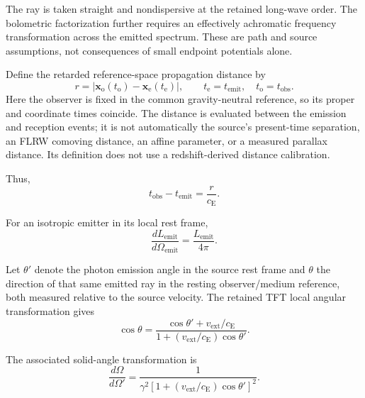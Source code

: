 The ray is taken straight and nondispersive at the retained long-wave order.
The bolometric factorization further requires an effectively achromatic
frequency transformation across the emitted spectrum. These are path and
source assumptions, not consequences of small endpoint potentials alone.

Define the retarded reference-space propagation distance by
\[
    r=\left|
        \mathbf x_{\mathrm o}(t_{\mathrm o})
        -\mathbf x_{\mathrm e}(t_{\mathrm e})
      \right|,
    \qquad
    t_{\mathrm e}=t_{\mathrm{emit}},\quad
    t_{\mathrm o}=t_{\mathrm{obs}}.
\]
Here the observer is fixed in the common gravity-neutral reference, so its
proper and coordinate times coincide. The distance is evaluated between the
emission and reception events; it is not automatically the source's
present-time separation, an FLRW comoving distance, an affine parameter, or
a measured parallax distance. Its definition does not use a redshift-derived
distance calibration.

Thus,
\begin{equation}
    t_{\mathrm{obs}}
    -
    t_{\mathrm{emit}}
    =
    \frac{r}{c_{\mathrm E}}.
\end{equation}

For an isotropic emitter in its local rest frame,
\begin{equation}
    \frac{
        dL_{\mathrm{emit}}
    }{
        d\Omega_{\mathrm{emit}}
    }
    =
    \frac{
        L_{\mathrm{emit}}
    }{
        4\pi
    }.
\end{equation}

Let \(\theta'\) denote the photon emission angle in the source rest frame
and \(\theta\) the direction of that same emitted ray in the resting
observer/medium reference, both measured relative to the source velocity.
The retained TFT local angular transformation gives
\begin{equation}
    \cos\theta
    =
    \frac{
        \cos\theta'
        +
        v_{\mathrm{ext}}/c_{\mathrm E}
    }{
        1+
        (v_{\mathrm{ext}}/c_{\mathrm E})
        \cos\theta'
    }.
\end{equation}

The associated solid-angle transformation is
\begin{equation}
    \frac{
        d\Omega
    }{
        d\Omega'
    }
    =
    \frac{1}{
        \gamma^2
        \left[
            1+
            (v_{\mathrm{ext}}/c_{\mathrm E})
            \cos\theta'
        \right]^2
    }.
\end{equation}

